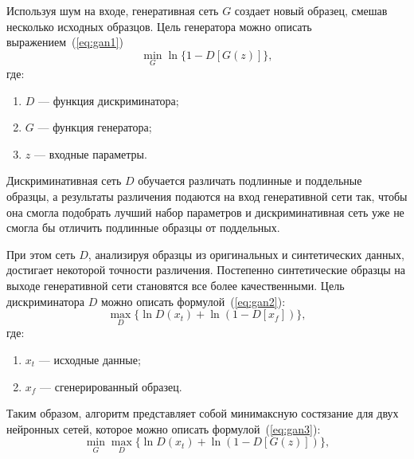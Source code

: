 \newpage
Используя шум на входе, генеративная сеть $G$ создает новый образец, смешав несколько исходных образцов. Цель генератора можно описать выражением~(\ref{eq:gan1})
\begin{equation}\label{eq:gan1}
	\min _G \ln\{1-D[G(z)]\},
\end{equation}
где:
\begin{enumerate}[label*=---]
	\item $D$ --- функция дискриминатора;
	\item  $G$ --- функция генератора;
	\item  $z$ --- входные параметры.
\end{enumerate}


Дискриминативная сеть $D$ обучается различать подлинные и поддельные образцы, а результаты различения подаются на вход генеративной сети так, чтобы она смогла подобрать лучший набор параметров и дискриминативная сеть уже не смогла бы отличить подлинные образцы от поддельных.~\cite{gan_r}

При этом сеть $D$, анализируя образцы из оригинальных и синтетических данных, достигает некоторой точности различения.
Постепенно синтетические образцы на выходе генеративной сети становятся все более качественными. Цель дискриминатора $D$ можно описать формулой~(\ref{eq:gan2}):
\begin{equation}\label{eq:gan2}
	\max _D \{\ln D(x_t) + \ln (1-D[x_f])\},
\end{equation}
где:
\begin{enumerate}[label*=---]
	\item $x_t$ --- исходные данные; 
	\item $x_f$ --- сгенерированный образец.
\end{enumerate}



Таким образом, алгоритм представляет собой минимаксную состязание для двух
нейронных сетей, которое можно описать формулой~(\ref{eq:gan3}):
\begin{equation}\label{eq:gan3}
	\min _G \max _D \{\ln D(x_t) + \ln (1-D[G(z)])\},
\end{equation}

